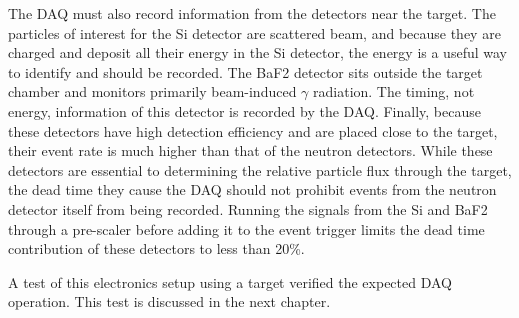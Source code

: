 The DAQ must also record information from the detectors near the target.  The particles of interest for the Si detector are scattered  beam, and because they are charged and deposit all their energy in the Si detector, the energy is a useful way to identify  and should be recorded.  The BaF2 detector sits outside the target chamber and monitors primarily beam-induced $\gamma$ radiation.  The timing, not energy, information of this detector is recorded by the DAQ.  Finally, because these detectors have high detection efficiency and are placed close to the target, their event rate is much higher than that of the neutron detectors.  While these detectors are essential to determining the relative particle flux through the target, the dead time they cause the DAQ should not prohibit events from the neutron detector itself from being recorded.  Running the signals from the Si and BaF2 through a pre-scaler before adding it to the event trigger limits the dead time contribution of these detectors to less than 20\%.

A test of this electronics setup using a  target verified the expected DAQ operation.  This test is discussed in the next chapter. 

%
% 
% 
